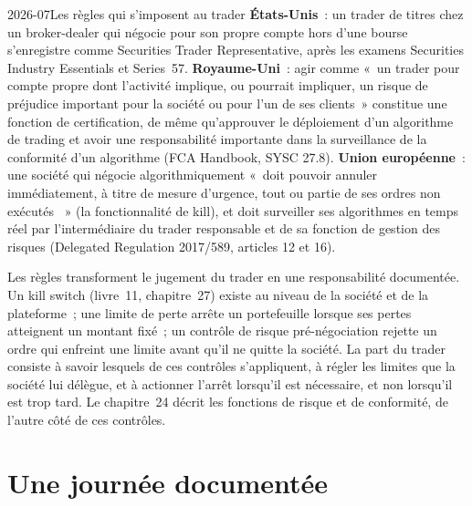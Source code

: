 \begin{dated}{2026-07}{Les règles qui s'imposent au trader}\label{dat:in:trader:controls}
\textbf{États-Unis}~: un trader de titres chez un broker-dealer qui négocie pour son propre compte hors d'une bourse s'enregistre comme
Securities Trader Representative, après les examens Securities Industry Essentials et Series~57. \textbf{Royaume-Uni}~: agir comme
«~un trader pour compte propre dont l'activité implique, ou pourrait impliquer, un risque de préjudice important pour la société ou pour
l'un de ses clients~» constitue une fonction de certification, de même qu'approuver le déploiement d'un algorithme de trading et avoir
une responsabilité importante dans la surveillance de la conformité d'un algorithme (FCA Handbook, SYSC 27.8). \textbf{Union européenne}~: une société qui négocie
algorithmiquement «~doit pouvoir annuler immédiatement, à titre de mesure d'urgence, tout ou partie de ses ordres non exécutés
~» (la fonctionnalité de kill), et doit surveiller ses algorithmes en temps réel par l'intermédiaire du trader responsable et de sa
fonction de gestion des risques (Delegated Regulation 2017/589, articles 12 et 16).
\end{dated}

Les règles transforment le jugement du trader en une responsabilité documentée. Un kill switch (livre~11, chapitre~27) existe au niveau de la société et
de la plateforme~; une limite de perte arrête un portefeuille lorsque ses pertes atteignent un montant fixé~; un contrôle de risque pré-négociation rejette un
ordre qui enfreint une limite avant qu'il ne quitte la société. La part du trader consiste à savoir lesquels de ces contrôles s'appliquent, à
régler les limites que la société lui délègue, et à actionner l'arrêt lorsqu'il est nécessaire, et non lorsqu'il est trop tard. Le chapitre~24 décrit
les fonctions de risque et de conformité, de l'autre côté de ces contrôles.

\section{Une journée documentée}

